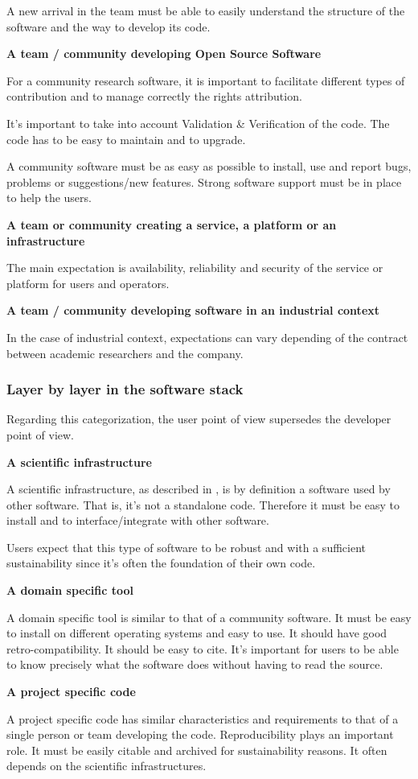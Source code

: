 A new arrival in the team must be able to easily understand the structure of the software and the way to develop its code.

\textbf{A team / community developing Open Source Software}

For a community research software, it is important to facilitate different types of contribution and to manage correctly the rights attribution.

It's important to take into account Validation \& Verification of the code. The code has to be easy to maintain and to upgrade.

A community software must be as easy as possible to install, use and report bugs, problems or suggestions/new features. Strong software support must be in place to help the users.

\textbf{A team or community creating a service, a platform or an infrastructure}

The main expectation is availability, reliability and security of the service or platform for users and operators.

\textbf{A team / community developing software in an industrial context}

In the case of industrial context, expectations can vary depending of the contract between academic researchers and the company.

\subsubsection{Layer by layer in the software stack}

Regarding this categorization, the user point of view supersedes the developer point of view.

\textbf{A scientific infrastructure}

A scientific infrastructure, as described in \cite{hinsen2019}, is by definition a software used by other software. That is, it's not a standalone code. Therefore it must be easy to install and to interface/integrate with other software.

Users expect that this type of software to be robust and with a sufficient sustainability since it's often the foundation of their own code.

\textbf{A domain specific tool}

A domain specific tool is similar to that of a community software. It must be easy to install on different operating systems and easy to use. It should have good retro-compatibility. It should be easy to cite. It's important for users to be able to know precisely what the software does without having to read the source. 

\textbf{A project specific code}

A project specific code has similar characteristics and requirements to that of a single person or team developing the code. Reproducibility plays an important role. It must be easily citable and archived for sustainability reasons. It often depends on the scientific infrastructures.
